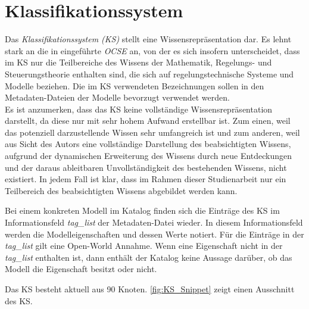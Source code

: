 \section{Klassifikationssystem}
\label{Ch:Ergebnisse:Sec:KS}
Das \textit{Klassifikationssystem (KS)} stellt eine Wissensrepräsentation dar. Es lehnt stark an die in \cite{KNHE20a} eingeführte \textit{OCSE} an, von der es sich insofern unterscheidet, dass im KS nur die Teilbereiche des Wissens der Mathematik, Regelungs- und Steuerungstheorie enthalten sind, die sich auf regelungstechnische Systeme und Modelle beziehen. Die im KS verwendeten Bezeichnungen sollen in den Metadaten-Dateien der Modelle bevorzugt verwendet werden. \\
Es ist anzumerken, dass das KS keine vollständige Wissensrepräsentation darstellt, da diese nur mit sehr hohem Aufwand erstellbar ist. Zum einen, weil das potenziell darzustellende Wissen sehr umfangreich ist und zum anderen, weil aus Sicht des Autors eine vollständige Darstellung des beabsichtigten Wissens, aufgrund der dynamischen Erweiterung des Wissens durch neue Entdeckungen und der daraus ableitbaren Unvollständigkeit des bestehenden Wissens, nicht existiert. In jedem Fall ist klar, dass im Rahmen dieser Studienarbeit nur ein Teilbereich des beabsichtigten Wissens abgebildet werden kann. 

Bei einem konkreten Modell im Katalog finden sich die Einträge des KS im Informationsfeld \textit{tag\_list} der Metadaten-Datei wieder. In diesem Informationsfeld werden die Modelleigenschaften und dessen Werte notiert. Für die Einträge in der \textit{tag\_list} gilt eine Open-World Annahme. Wenn eine Eigenschaft nicht in der \textit{tag\_list} enthalten ist, dann enthält der Katalog keine Aussage darüber, ob das Modell die Eigenschaft besitzt oder nicht.

Das KS besteht aktuell aus 90 Knoten. \autoref{fig:KS_Snippet} zeigt einen Ausschnitt des KS.

